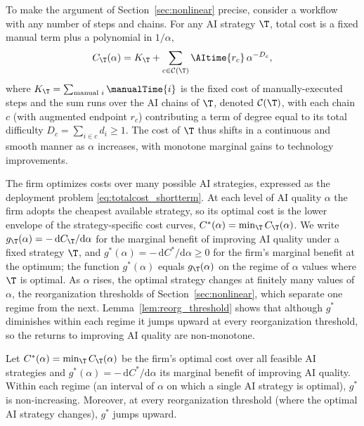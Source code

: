 To make the argument of Section~\ref{sec:nonlinear} precise, consider a workflow with any number of steps and chains.
For any AI strategy $\T$, total cost is a fixed manual term plus a polynomial in $1/\alpha$,
\begin{equation}
\label{eq:strategy_cost}
C_\T(\alpha) = K_\T + \sum_{c \in \mathcal{C}(\T)} \AItime{r_c}\,\alpha^{-D_c},
\end{equation}
where $K_\T = \sum_{\text{manual } i} \manualTime{i}$ is the fixed cost of manually-executed steps and the sum runs over the AI chains of $\T$, denoted $\mathcal{C}(\T)$, with each chain $c$ (with augmented endpoint $r_c$) contributing a term of degree equal to its total difficulty $D_c = \sum_{i \in c} d_i \ge 1$.
The cost of $\T$ thus shifts in a continuous and smooth manner as $\alpha$ increases, with monotone marginal gains to technology improvements.

The firm optimizes costs over many possible AI strategies, expressed as the deployment problem \eqref{eq:totalcost_shortterm}.
At each level of AI quality $\alpha$ the firm adopts the cheapest available strategy, so its optimal cost is the lower envelope of the strategy-specific cost curves, $C^*(\alpha) = \min_{\T} C_\T(\alpha)$.
We write $g_\T(\alpha) = -\,\mathrm{d}C_\T/\mathrm{d}\alpha$ for the marginal benefit of improving AI quality under a fixed strategy $\T$, and $g^*(\alpha) = -\,\mathrm{d}C^*/\mathrm{d}\alpha \ge 0$ for the firm's marginal benefit at the optimum; the function $g^*(\alpha)$ equals $g_\T(\alpha)$ on the regime of $\alpha$ values where $\T$ is optimal.
As $\alpha$ rises, the optimal strategy changes at finitely many values of $\alpha$, the reorganization thresholds of Section~\ref{sec:nonlinear}, which separate one regime from the next.
Lemma~\ref{lem:reorg_threshold} shows that although $g^*$ diminishes within each regime it jumps upward at every reorganization threshold, so the returns to improving AI quality are non-monotone.

\begin{lem}
\label{lem:reorg_threshold}
Let $C^*(\alpha) = \min_{\T} C_\T(\alpha)$ be the firm's optimal cost over all feasible AI strategies and $g^*(\alpha) = -\,\mathrm{d}C^*/\mathrm{d}\alpha$ its marginal benefit of improving AI quality.
Within each regime (an interval of $\alpha$ on which a single AI strategy is optimal), $g^*$ is non-increasing.
Moreover, at every reorganization threshold (where the optimal AI strategy changes), $g^*$ jumps upward.
\end{lem}

